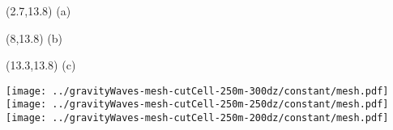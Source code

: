 \documentclass{article}
\begin{document}
\TPMargin{2pt}
\begin{textblock}{0.5}(2.7,13.8)
\normalsize
(a)
\end{textblock}
\begin{textblock}{1}(8,13.8)
\normalsize
(b)
\end{textblock}
\begin{textblock}{1}(13.3,13.8)
\normalsize
(c)
\end{textblock}
\texttt{[image: ../gravityWaves-mesh-cutCell-250m-300dz/constant/mesh.pdf]}
\texttt{[image: ../gravityWaves-mesh-cutCell-250m-250dz/constant/mesh.pdf]}
\texttt{[image: ../gravityWaves-mesh-cutCell-250m-200dz/constant/mesh.pdf]}
\end{document}
